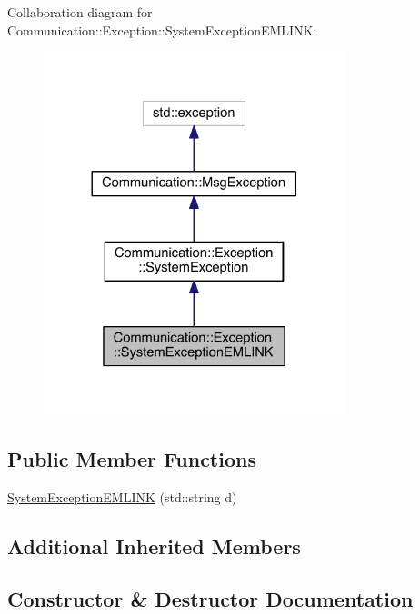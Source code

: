Collaboration diagram for Communication\+:\+:Exception\+:\+:System\+Exception\+E\+M\+L\+I\+N\+K\+:\nopagebreak
\begin{figure}[H]
\begin{center}
\leavevmode
\includegraphics[width=248pt]{class_communication_1_1_exception_1_1_system_exception_e_m_l_i_n_k__coll__graph}
\end{center}
\end{figure}
\subsection*{Public Member Functions}
\begin{DoxyCompactItemize}
\item 
\hyperlink{class_communication_1_1_exception_1_1_system_exception_e_m_l_i_n_k_a42ee021e266e767884e2764c587b65b4}{System\+Exception\+E\+M\+L\+I\+N\+K} (std\+::string d)
\end{DoxyCompactItemize}
\subsection*{Additional Inherited Members}


\subsection{Constructor \& Destructor Documentation}
\hypertarget{class_communication_1_1_exception_1_1_system_exception_e_m_l_i_n_k_a42ee021e266e767884e2764c587b65b4}{}
